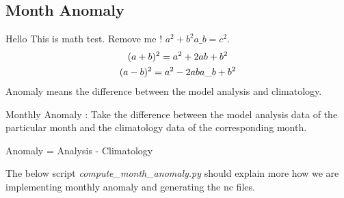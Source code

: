 \documentclass[letterpaper,10pt,english]{sphinxmanual}
\begin{document}
\subsection{Month Anomaly}
\label{diagnosis:month-anomaly}
Hello This is math test. Remove me ! $a^2 + b^2 a\_b = c^2$.
\begin{gather}
\begin{split}(a + b)^2 = a^2 + 2ab + b^2\end{split}\notag\\\begin{split}(a - b)^2 = a^2 - 2ab a\_b + b^2\end{split}\notag
\end{gather}
Anomaly means the difference between the model analysis and climatology.

Monthly Anomaly : Take the difference between the model analysis data of the particular month and the climatology data of the corresponding month.

Anomaly = Analysis - Climatology

The below script \emph{compute\_month\_anomaly.py} should explain more how we are implementing monthly anomaly and generating the nc files.
\label{diagnosis:module-compute_month_anomaly}\label{diagnosis:module-compute_month_anomaly.py}
\end{document}
